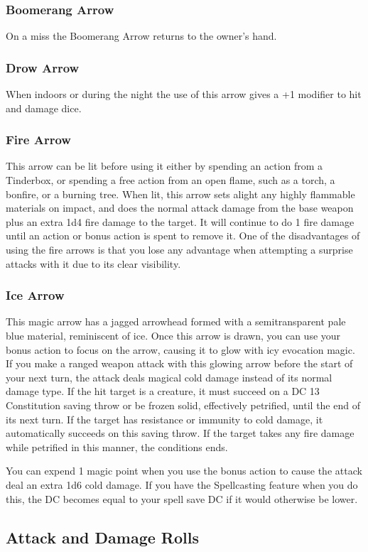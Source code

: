 \documentclass[letterpaper,openany,oneside,twocolumn]{book}
\begin{document}
\subsubsection*{Boomerang Arrow}
On a miss the Boomerang Arrow returns to the owner's hand.
\subsubsection*{Drow Arrow}
When indoors or during the night the use of this arrow gives a +1 modifier to hit and damage dice.
\subsubsection*{Fire Arrow}
This arrow can be lit before using it either by spending an action from a Tinderbox, or spending a free action from an open flame, such as a torch, a bonfire, or a burning tree. When lit, this arrow sets alight any highly flammable materials on impact, and does the normal attack damage from the base weapon plus an extra 1d4 fire damage to the target. It will continue to do 1 fire damage until an action or bonus action is spent to remove it. One of the disadvantages of using the fire arrows is that you lose any advantage when attempting a surprise attacks with it due to its clear visibility.
\subsubsection*{Ice Arrow}
This magic arrow has a jagged arrowhead formed with a semitransparent pale blue material, reminiscent of ice. Once this arrow is drawn, you can use your bonus action to focus on the arrow, causing it to glow with icy evocation magic. If you make a ranged weapon attack with this glowing arrow before the start of your next turn, the attack deals magical cold damage instead of its normal damage type. If the hit target is a creature, it must succeed on a DC 13 Constitution saving throw or be frozen solid, effectively petrified, until the end of its next turn. If the target has resistance or immunity to cold damage, it automatically succeeds on this saving throw. If the target takes any fire damage while petrified in this manner, the conditions ends.

You can expend 1 magic point when you use the bonus action to cause the attack deal an extra 1d6 cold damage. If you have the Spellcasting feature when you do this, the DC becomes equal to your spell save DC if it would otherwise be lower.

\subsection*{Attack and Damage Rolls}
\end{document}

